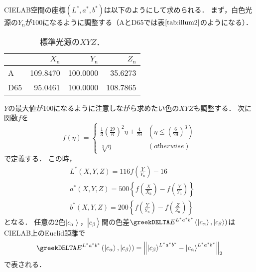\documentclass[uplatex,paper=a4,fontsize=4.0truemm,jafontsize=4.0truemm,head_space=30.0truemm,foot_space=30.0truemm,baselineskip=8.0truemm,line_length=40zw,gutter=25.0truemm,oneside,openany,fleqn,hanging_panctuation,open_bracket_pos=nibu_tentsuki,dvipdfmx,jis2004,book,titlepage]{jlreq}
\theoremstyle{mystyle}
\newcommand{\captiondot}[1]{\caption{#1．}}
\newcommand{\tableinput}[4]{\begin{table}[btp]\centering\captiondot{#3}\label{tab:#4}\begin{tabular}{#1}#2\end{tabular}\end{table}}
\newcommand{\mathdisplaystyle}[1]{\(\displaystyle{#1}\)}
\newcommand{\Reference}[1]{\mathdisplaystyle{\ref{#1}}}
\newcommand{\fraction}[2]{\displaystyle{\frac{\displaystyle{#1}}{\displaystyle{#2}}}}
\newcommand{\parentheses}[1]{\left(#1\right)}
\newcommand{\braces}[1]{\left\{#1\right\}}
\newcommand{\norm}[2]{{\left\lVert#1\right\rVert}_{#2}}
\newcommand{\Diracket}[1]{\left\lvert#1\right\rangle}
\begin{document}
			CIELAB空間の座標\mathdisplaystyle{\parentheses{L^\ast,a^\ast,b^\ast}}は以下のようにして求められる．
			まず，白色光源の\mathdisplaystyle{Y_\textrm{n}}が100になるように調整する（AとD65では表\Reference{tab:illum2}のようになる）．
			\tableinput{l|rrr}{ & \(X_\textrm{n}\) & \(Y_\textrm{n}\) & \(Z_\textrm{n}\) \\ \hline
				A & 109.8470 & 100.0000 & 35.6273 \\
				D65 & 95.0461 & 100.0000 & 108.7865}{標準光源の\mathdisplaystyle{XYZ}}{illum2}
			\mathdisplaystyle{Y}の最大値が100になるように注意しながら求めたい色の\mathdisplaystyle{XYZ}も調整する．
			次に関数\mathdisplaystyle{f}を
			\begin{equation*}
				f\parentheses{\eta}=\begin{cases}
					\fraction{1}{3}\parentheses{\fraction{29}{6}}^2\eta+\fraction{4}{29} & \parentheses{\eta\leq\parentheses{\fraction{6}{29}}^3} \\
					\sqrt[3]{\eta} & \parentheses{\textit{otherwise}}
				\end{cases}
			\end{equation*}
			で定義する．
			この時，
			\begin{align*}
				&L^\ast\parentheses{X,Y,Z}=116f\parentheses{\fraction{Y}{Y_\textrm{n}}}-16\\
				&a^\ast\parentheses{X,Y,Z}=500\braces{f\parentheses{\fraction{X}{X_\textrm{n}}}-f\parentheses{\fraction{Y}{Y_\textrm{n}}}}\\
				&b^\ast\parentheses{X,Y,Z}=200\braces{f\parentheses{\fraction{Y}{Y_\textrm{n}}}-f\parentheses{\fraction{Z}{Z_\textrm{n}}}}
			\end{align*}
			となる．
			任意の2色\mathdisplaystyle{\Diracket{c_\alpha}}，\mathdisplaystyle{\Diracket{c_\beta}}間の色差\mathdisplaystyle{\greekDELTA E^{L^\ast a^\ast b^\ast}\parentheses{\Diracket{c_\alpha},\Diracket{c_\beta}}}はCIELAB上のEuclid距離で
			\begin{equation}
				\greekDELTA E^{L^\ast a^\ast b^\ast}\parentheses{\Diracket{c_\alpha},\Diracket{c_\beta}}=\norm{\Diracket{c_\beta}^{L^\ast a^\ast b^\ast}-\Diracket{c_\alpha}^{L^\ast a^\ast b^\ast}}{2}\label{eq:LAB}
			\end{equation}
			で表される．
\end{document}
